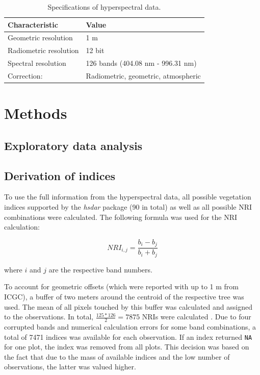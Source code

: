\documentclass[review]{elsarticle}
\begin{document}
\begin{table}[b!]
\centering
\caption[t]{Specifications of hyperspectral data.}
\begingroup\footnotesize
\begin{tabular}{ll}
	\\
	Characteristic         & Value                               \\
	\hline
	Geometric resolution   & 1 m                                 \\
	Radiometric resolution & 12 bit                              \\
	Spectral resolution    & 126 bands (404.08 nm - 996.31 nm)   \\
	Correction:            & Radiometric, geometric, atmospheric
\end{tabular}
\endgroup
\label{tab:hyperparameter_limits}
\end{table}





\section{Methods}

\subsection{Exploratory data analysis}

\subsection{Derivation of indices}
\noindent To use the full information from the hyperspectral data, all possible vegetation indices supported by the \textit{hsdar} package (90 in total) as well as all possible \ac{NRI} combinations were calculated.
The following formula was used for the NRI calculation:

\begin{equation}
	NRI_{i,j} = \frac{b_{i} - b_{j}}{b_{i} + b_{j}}
\end{equation}

\noindent
where $i$ and $j$ are the respective band numbers.

\bigbreak

\noindent To account for geometric offsets (which were reported with up to 1 m from \ac{ICGC}), a buffer of two meters around the centroid of the respective tree was used.
The mean of all pixels touched by this buffer was calculated and assigned to the observations.
In total, $\frac{125*126}{2} = 7875$ NRIs were calculated .
Due to four corrupted bands and numerical calculation errors for some band combinations, a total of 7471 indices was available for each observation.
If an index returned \texttt{NA} for one plot, the index was removed from all plots.
This decision was based on the fact that due to the mass of available indices and the low number of observations, the latter was valued higher.
\end{document}

